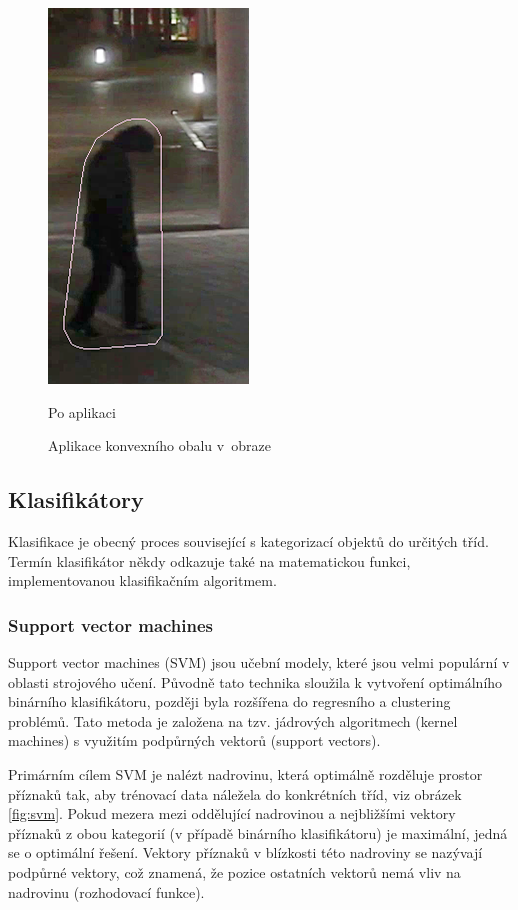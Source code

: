 \begin{figure}[H]
\begin{minipage}{.5\textwidth}
  \includegraphics[width=.5\linewidth]{figures/Hull_Result}
  \caption*{Po aplikaci}
  \label{fig:result}
\end{minipage}
\caption{Aplikace konvexního obalu v~obraze}
\label{fig:convexHull}
\end{figure} 

\subsection{Klasifikátory}
Klasifikace je obecný proces související s kategorizací objektů do určitých tříd. Termín klasifikátor někdy odkazuje také na matematickou funkci, implementovanou klasifikačním algoritmem.
\subsubsection*{Support vector machines} %
Support vector machines (SVM) jsou učební modely, které jsou velmi populární v oblasti strojového učení. Původně tato technika sloužila k vytvoření optimálního binárního klasifikátoru, později byla rozšířena do regresního a clustering problémů. Tato metoda je založena na tzv. jádrových algoritmech (kernel machines) s využitím podpůrných vektorů (support vectors).

Primárním cílem SVM je nalézt nadrovinu, která optimálně rozděluje prostor příznaků tak, aby trénovací data náležela do konkrétních tříd, viz obrázek \ref{fig:svm}. Pokud mezera mezi oddělující nadrovinou a nejbližšími vektory příznaků z obou kategorií (v případě binárního klasifikátoru) je maximální, jedná se o optimální řešení. Vektory příznaků v blízkosti této nadroviny se nazývají podpůrné vektory, což znamená, že pozice ostatních vektorů nemá vliv na nadrovinu (rozhodovací funkce). 

